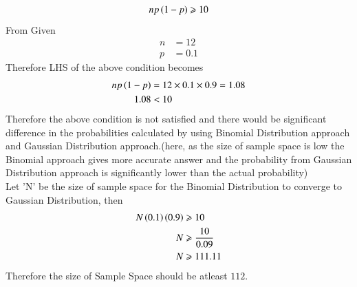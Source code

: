 \documentclass[journal,12pt,twocolumn]{IEEEtran}
\begin{document}
 \begin{align}
    np\left(1-p\right)\geqslant 10
    \end{align}
From Given
 \begin{align}
    n&=12\nonumber\\
    p&=0.1\nonumber
    \end{align}
Therefore LHS of the above condition becomes
 \begin{align}
    np\left(1-p\right)&=12\times0.1\times0.9=1.08\nonumber\\
    1.08 &< 10\nonumber
    \end{align}
Therefore the above condition is not satisfied and there would be significant difference in the probabilities calculated by using Binomial Distribution approach and Gaussian Distribution approach.(here, as the size of sample space is low the Binomial approach gives more accurate answer and the probability from Gaussian Distribution approach is significantly lower than the actual probability)
\\Let 'N' be the size of sample space for the Binomial Distribution to converge to Gaussian Distribution, then
\begin{align}
    N\left(0.1\right)\left(0.9\right)&\geqslant 10\nonumber\\
    N&\geqslant \frac{10}{0.09}\nonumber\\
    N&\geqslant 111.11
    \end{align}
Therefore the size of Sample Space should be atleast $112$.
\end{document}
